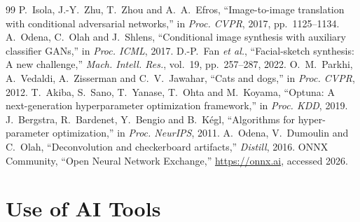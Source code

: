 \documentclass[conference]{IEEEtran}
\begin{document}
\begin{thebibliography}{99}
 P.~Isola, J.-Y.~Zhu, T.~Zhou and A.~A.~Efros, ``Image-to-image translation with conditional adversarial networks,'' in \emph{Proc. CVPR}, 2017, pp.~1125--1134.
 A.~Odena, C.~Olah and J.~Shlens, ``Conditional image synthesis with auxiliary classifier GANs,'' in \emph{Proc. ICML}, 2017.
 D.-P.~Fan \emph{et al.}, ``Facial-sketch synthesis: A new challenge,'' \emph{Mach. Intell. Res.}, vol.~19, pp.~257--287, 2022.
 O.~M.~Parkhi, A.~Vedaldi, A.~Zisserman and C.~V.~Jawahar, ``Cats and dogs,'' in \emph{Proc. CVPR}, 2012.
 T.~Akiba, S.~Sano, T.~Yanase, T.~Ohta and M.~Koyama, ``Optuna: A next-generation hyperparameter optimization framework,'' in \emph{Proc. KDD}, 2019.
 J.~Bergstra, R.~Bardenet, Y.~Bengio and B.~K\'egl, ``Algorithms for hyper-parameter optimization,'' in \emph{Proc. NeurIPS}, 2011.
 A.~Odena, V.~Dumoulin and C.~Olah, ``Deconvolution and checkerboard artifacts,'' \emph{Distill}, 2016.
 ONNX Community, ``Open Neural Network Exchange,'' \url{https://onnx.ai}, accessed 2026.
\end{thebibliography}

\appendices
\section{Use of AI Tools}

\end{document}

